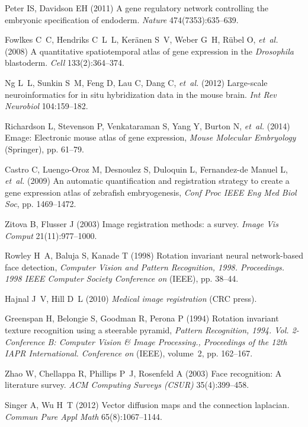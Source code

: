 \documentclass{pnastwo}
\begin{document}
\begin{article}
\begin{thebibliography}{10}
Peter IS, Davidson EH (2011) A gene regulatory network controlling the embryonic
specification of endoderm. \textit{Nature} 474(7353):635--639.


Fowlkes C~C, Hendriks C~L~L, Ker{\"a}nen S~V, Weber G~H, R{\"u}bel O,
  \textit{et~al.} (2008) A quantitative spatiotemporal atlas of gene expression
  in the \textit{{D}rosophila} blastoderm. \textit{Cell} 133(2):364--374.

Ng L~L, Sunkin S~M, Feng D, Lau C, Dang C, \textit{et~al.} (2012) Large-scale
  neuroinformatics for in situ hybridization data in the mouse brain.
  \textit{Int Rev Neurobiol} 104:159--182.

Richardson L, Stevenson P, Venkataraman S, Yang Y, Burton N, \textit{et~al.}
  (2014) Emage: Electronic mouse atlas of gene expression, \textit{Mouse
  Molecular Embryology} (Springer), pp. 61--79.

Castro C, Luengo-Oroz M, Desnoulez S, Duloquin L, Fernandez-de Manuel L,
  \textit{et~al.} (2009) An automatic quantification and registration strategy
  to create a gene expression atlas of zebrafish embryogenesis,
  \textit{Conf Proc IEEE Eng Med Biol Soc}, pp. 1469--1472.

Zitova B, Flusser J (2003) Image registration methods: a survey. \textit{Image Vis Comput} 21(11):977--1000.

Rowley H~A, Baluja S, Kanade T (1998) Rotation invariant neural network-based
  face detection, \textit{Computer Vision and Pattern Recognition, 1998.
  Proceedings. 1998 IEEE Computer Society Conference on} (IEEE), pp. 38--44.

Hajnal J~V, Hill D~L (2010) \textit{Medical image registration} (CRC press).

Greenspan H, Belongie S, Goodman R, Perona P (1994) Rotation invariant texture
  recognition using a steerable pyramid, \textit{Pattern Recognition, 1994.
  Vol. 2-Conference B: Computer Vision \& Image Processing., Proceedings of the
  12th IAPR International. Conference on} (IEEE), volume~2, pp. 162--167.

Zhao W, Chellappa R, Phillips P~J, Rosenfeld A (2003) Face recognition: A
  literature survey. \textit{ACM Computing Surveys (CSUR)} 35(4):399--458.

Singer A, Wu H~T (2012) Vector diffusion maps and the connection laplacian.
  \textit{Commun Pure Appl Math} 65(8):1067--1144.


\end{thebibliography}
\end{article}
\end{document}
